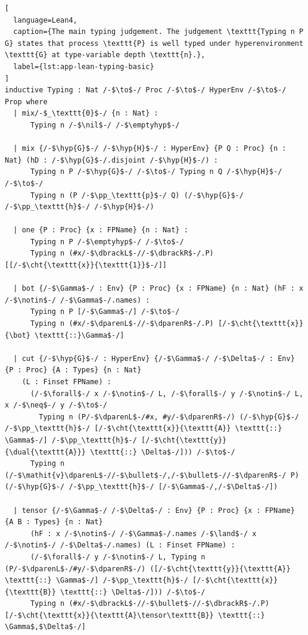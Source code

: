 \begin{lstlisting}[
  language=Lean4,
  caption={The main typing judgement. The judgement \texttt{Typing n P G} states that process \texttt{P} is well typed under hyperenvironment \texttt{G} at type-variable depth \texttt{n}.},
  label={lst:app-lean-typing-basic}
]
inductive Typing : Nat /-$\to$-/ Proc /-$\to$-/ HyperEnv /-$\to$-/ Prop where
  | mix/-$_\texttt{0}$-/ {n : Nat} :
      Typing n /-$\nil$-/ /-$\emptyhyp$-/ 

  | mix {/-$\hyp{G}$-/ /-$\hyp{H}$-/ : HyperEnv} {P Q : Proc} {n : Nat} (hD : /-$\hyp{G}$-/.disjoint /-$\hyp{H}$-/) :
      Typing n P /-$\hyp{G}$-/ /-$\to$-/ Typing n Q /-$\hyp{H}$-/ /-$\to$-/
      Typing n (P /-$\pp_\texttt{p}$-/ Q) (/-$\hyp{G}$-/ /-$\pp_\texttt{h}$-/ /-$\hyp{H}$-/)

  | one {P : Proc} {x : FPName} {n : Nat} :
      Typing n P /-$\emptyhyp$-/ /-$\to$-/
      Typing n (#x/-$\dbrackL$-//-$\dbrackR$-/.P) [[/-$\cht{\texttt{x}}{\texttt{1}}$-/]]

  | bot {/-$\Gamma$-/ : Env} {P : Proc} {x : FPName} {n : Nat} (hF : x /-$\notin$-/ /-$\Gamma$-/.names) :
      Typing n P [/-$\Gamma$-/] /-$\to$-/
      Typing n (#x/-$\dparenL$-//-$\dparenR$-/.P) [/-$\cht{\texttt{x}}{\bot} \texttt{::}\Gamma$-/]

  | cut {/-$\hyp{G}$-/ : HyperEnv} {/-$\Gamma$-/ /-$\Delta$-/ : Env} {P : Proc} {A : Types} {n : Nat} 
    (L : Finset FPName) :
      (/-$\forall$-/ x /-$\notin$-/ L, /-$\forall$-/ y /-$\notin$-/ L, x /-$\neq$-/ y /-$\to$-/
        Typing n (P/-$\dparenL$-/#x, #y/-$\dparenR$-/) (/-$\hyp{G}$-/ /-$\pp_\texttt{h}$-/ [/-$\cht{\texttt{x}}{\texttt{A}} \texttt{::} \Gamma$-/] /-$\pp_\texttt{h}$-/ [/-$\cht{\texttt{y}}{\dual{\texttt{A}}} \texttt{::} \Delta$-/])) /-$\to$-/
      Typing n (/-$\mathit{v}\dparenL$-//-$\bullet$-/,/-$\bullet$-//-$\dparenR$-/ P) (/-$\hyp{G}$-/ /-$\pp_\texttt{h}$-/ [/-$\Gamma$-/,/-$\Delta$-/])

  | tensor {/-$\Gamma$-/ /-$\Delta$-/ : Env} {P : Proc} {x : FPName} {A B : Types} {n : Nat}
      (hF : x /-$\notin$-/ /-$\Gamma$-/.names /-$\land$-/ x /-$\notin$-/ /-$\Delta$-/.names) (L : Finset FPName) :
      (/-$\forall$-/ y /-$\notin$-/ L, Typing n (P/-$\dparenL$-/#y/-$\dparenR$-/) ([/-$\cht{\texttt{y}}{\texttt{A}} \texttt{::} \Gamma$-/] /-$\pp_\texttt{h}$-/ [/-$\cht{\texttt{x}}{\texttt{B}} \texttt{::} \Delta$-/])) /-$\to$-/
      Typing n (#x/-$\dbrackL$-//-$\bullet$-//-$\dbrackR$-/.P) [/-$\cht{\texttt{x}}{\texttt{A}\tensor\texttt{B}} \texttt{::} \Gamma$,$\Delta$-/]


\end{lstlisting}
